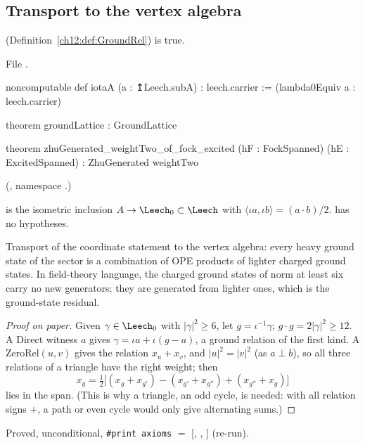 \subsection{Transport to the vertex algebra}

\begin{theorem}\label{ch12:thm:groundLattice}
 (Definition~\ref{ch12:def:GroundRel}) is true.
\end{theorem}
File .
\begin{leancode}
noncomputable def iotaA (a : ↥Leech.subA) : leech.carrier := (lambda0Equiv a : leech.carrier)

theorem groundLattice : GroundLattice

theorem zhuGenerated_weightTwo_of_fock_excited (hF : FockSpanned) (hE : ExcitedSpanned) :
    ZhuGenerated weightTwo
\end{leancode}
(, namespace .)
\begin{dictionary}
 is the isometric inclusion $A\to\Leech_0\subset\Leech$ with $\langle\iota a,\iota
b\rangle=(a\cdot b)/2$.   has no hypotheses.
\end{dictionary}

\begin{physics}
Transport of the coordinate statement to the vertex algebra: every heavy ground state of the sector is a combination of OPE products of lighter charged ground states. In field-theory language, the charged ground states of norm at least six carry no new generators; they are generated from lighter ones, which is the ground-state residual.
\end{physics}
\begin{proof}[Proof on paper]
Given $\gamma\in\Leech_0$ with $|\gamma|^2\ge6$, let $g=\iota^{-1}\gamma$; $g\cdot g=2|\gamma|^2\ge12$.  A
$\mathrm{Direct}$ witness $a$ gives $\gamma=\iota a+\iota(g-a)$, a ground relation of the first kind.  A
$\mathrm{ZeroRel}(u,v)$ gives the relation $x_u+x_v$, and $|u|^2=|v|^2$ (as $a\perp b$), so all three
relations of a triangle have the right weight; then
\begin{equation*}
 x_g=\tfrac12\big[(x_g+x_{g'})-(x_{g'}+x_{g''})+(x_{g''}+x_g)\big]
\end{equation*}
lies in the span.  (This is why a triangle, an odd cycle, is needed: with all relation signs $+$, a path
or even cycle would only give alternating sums.)
\end{proof}
\begin{status}Proved, unconditional, \texttt{\#print axioms} $=$ [,
, ] (re-run).\end{status}

